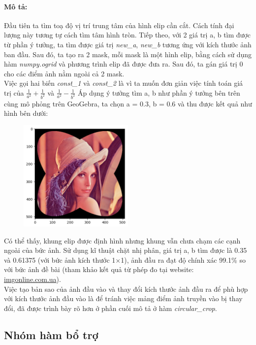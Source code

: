 \documentclass{article}
\begin{document}
\paragraph{Mô tả:} Đầu tiên ta tìm toạ độ vị trí trung tâm của hình elip cần cắt. Cách tính đại lượng này tương tự cách tìm tâm hình tròn. Tiếp theo, với 2 giá trị a, b tìm được từ phần ý tưởng, ta tìm được giá trị \textit{new\_a}, \textit{new\_b} tương ứng với kích thước ảnh ban đầu. Sau đó, ta tạo ra 2 mask, mỗi mask là một hình elip, bằng cách sử dụng hàm \textit{numpy.ogrid} và phương trình elip đã được đưa ra. Sau đó, ta gán giá trị 0 cho các điểm ảnh nằm ngoài cả 2 mask.\\
Việc gọi hai biến \textit{const\_1} và \textit{const\_2} là vì ta muốn đơn giản việc tính toán giá trị của $\frac{1}{a^2} + \frac{1}{b^2}$ và $\frac{1}{a^2} - \frac{1}{b^2}$
Áp dụng ý tưởng tìm a, b như phần ý tưởng bên trên cùng mô phỏng trên GeoGebra, ta chọn a = 0.3, b = 0.6 và thu được kết quả như hình bên dưới:
\begin{figure}[!ht]
  \centering
  \includegraphics[width=0.5\textwidth]{image/lenna_03_06.png}
\end{figure} \par
Có thể thấy, khung elip được định hình nhưng khung vẫn chưa chạm các cạnh ngoài của bức ảnh. Sử dụng kĩ thuật chặt nhị phân, giá trị a, b tìm được là 0.35 và 0.61375 (với bức ảnh kích thước 1$\times$1), ảnh đầu ra đạt độ chính xác 99.1\% so với bức ảnh đề bài (tham khảo kết quả từ phép đo tại website: \href{https://www.imgonline.com.ua/eng/similarity-percent.php}{imgonline.com.ua}).\\
Việc tạo bản sao của ảnh đầu vào và thay đổi kích thước ảnh đầu ra để phù hợp với kích thước ảnh đầu vào là để tránh việc mảng điểm ảnh truyền vào bị thay đổi, đã được trình bày rõ hơn ở phần cuối mô tả ở hàm \textit{circular\_crop}.
\subsection{Nhóm hàm bổ trợ}
\end{document}
